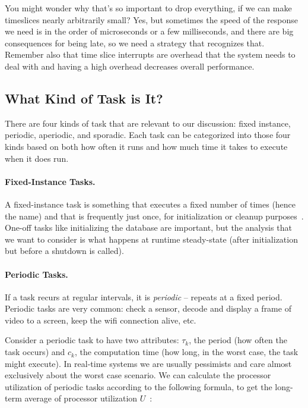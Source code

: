 You might wonder why that's so important to drop everything, if we can make timeslices nearly arbitrarily small? Yes, but sometimes the speed of the response we need is in the order of microseconds or a few milliseconds, and there are big consequences for being late, so we need a strategy that recognizes that. Remember also that time slice interrupts are overhead that the system needs to deal with and having a high overhead decreases overall performance.

\subsection*{What Kind of Task is It?}

There are four kinds of task that are relevant to our discussion: fixed instance, periodic, aperiodic, and sporadic. Each task can be categorized into those four kinds based on both how often it runs and how much time it takes to execute when it does run. 

\paragraph{Fixed-Instance Tasks.} A fixed-instance task is something that executes a fixed number of times (hence the name) and that is frequently just once, for initialization or cleanup purposes~\cite{mte241}. One-off tasks like initializing the database are important, but the analysis that we want to consider is what happens at runtime steady-state (after initialization but before a shutdown is called).  


\paragraph{Periodic Tasks.} If a task recurs at regular intervals, it is \textit{periodic} -- repeats at a fixed period. Periodic tasks are very common: check a sensor, decode and display a frame of video to a screen, keep the wifi connection alive, etc.

Consider a periodic task to have two attributes: $\tau_{k}$, the period (how often the task occurs) and $c_{k}$, the computation time (how long, in the worst case, the task might execute). In real-time systems we are usually pessimists and care almost exclusively about the worst case scenario. We can calculate the processor utilization of periodic tasks according to the following formula, to get the long-term average of processor utilization $U$~\cite{mte241}:

